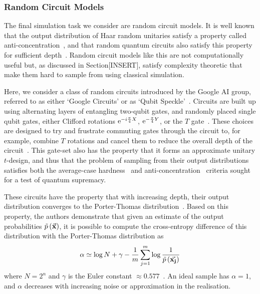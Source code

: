 \subsubsection*{Random Circuit Models}
The final simulation task we consider are random circuit models. It is well known that the output distribution of Haar random unitaries satisfy a property called anti-concentration~\cite{Hangleiter2017}, and that random quantum circuits also satisfy this property for sufficient depth~\cite{Aaronson2016,Emerson2098,Harrow2017}. Random circuit models like this are not computationally useful but, as discussed in Section[INSERT], satisfy complexity theoretic that make them hard to sample from using classical simulation.\par
Here, we consider a class of random circuits introduced by the Google AI group, referred to as either `Google Circuits' or as `Qubit Speckle'~\cite{Aaronson2016,Martinis2016}. Circuits are built up using alternating layers of entangling two-qubit gates, and randomly placed single qubit gates, either Clifford rotations $\mathrm{e}^{-i\frac{\pi}{4} X}$, $\mathrm{e}^{-\frac{\pi}{4} Y}$, or the $T$ gate~\cite{Boixo2016}. These choices are designed to try and frustrate commuting gates through the circuit to, for example, combine $T$ rotations and cancel them to reduce the overall depth of the circuit~\cite{Harrow2017}. This gate-set also has the property that it forms an approximate unitary $t$-design, and thus that the problem of sampling from their output distributions satisfies both the average-case hardness~\cite{Bouland2018,Movassagh2018} and anti-concentration~\cite{Brandao2010,Hangleiter2017} criteria sought for a test of quantum supremacy.\par
These circuits have the property that with increasing depth, their output distribution converges to the Porter-Thomas distribution~\cite{Boixo2016}. Based on this property, the authors demonstrate that given an estimate of the output probabilities $\tilde{p}\left(\va{x}\right)$, it is possible to compute the cross-entropy difference of this distribution with the Porter-Thomas distribution as
\begin{equation}
\alpha \simeq \log{N} + \gamma - \frac{1}{m}\sum_{j=1}^{m}\log{\frac{1}{\tilde{p}\left(\va{x_{j}}\right)}}
\label{eq:cross_entropy}
\end{equation}
where $N=2^{n}$ and $\gamma$ is the Euler constant $\approx 0.577$~\cite{Boixo2016}. An ideal sample has $\alpha=1$, and $\alpha$ decreases with increasing noise or approximation in the realisation.\par
